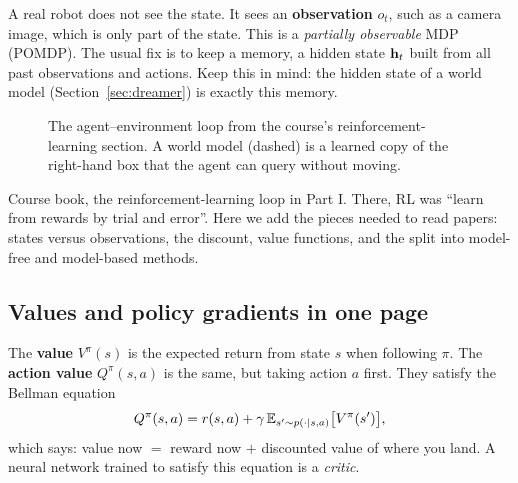 A real robot does not see the state. It sees an \textbf{observation} $o_t$, such as a camera image, which is only part of the state. This is a \emph{partially observable} MDP (POMDP). The usual fix is to keep a memory, a hidden state $\mathbf{h}_t$ built from all past observations and actions. Keep this in mind: the hidden state of a world model (Section~\ref{sec:dreamer}) is exactly this memory.

\begin{figure}[h]
\centering
{}
\caption{The agent--environment loop from the course's reinforcement-learning section. A world model (dashed) is a learned copy of the right-hand box that the agent can query without moving.}
\label{fig:loop}
\end{figure}

\begin{bridgebox}
Course book, the reinforcement-learning loop in Part I. There, RL was ``learn from rewards by trial and error''. Here we add the pieces needed to read papers: states versus observations, the discount, value functions, and the split into model-free and model-based methods.
\end{bridgebox}

\subsection{Values and policy gradients in one page}
The \textbf{value} $V^\pi(s)$ is the expected return from state $s$ when following $\pi$. The \textbf{action value} $Q^\pi(s,a)$ is the same, but taking action $a$ first. They satisfy the Bellman equation
\begin{equation}
Q^\pi(s,a)=r(s,a)+\gamma\,\mathbb{E}_{s'\sim p(\cdot\mid s,a)}\big[V^\pi(s')\big],\label{eq:bellman}
\end{equation}
which says: value now $=$ reward now $+$ discounted value of where you land. A neural network trained to satisfy this equation is a \emph{critic}.

